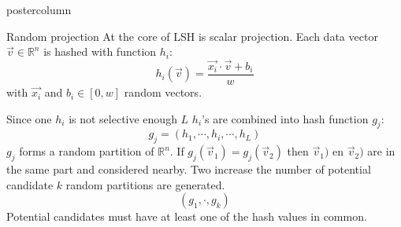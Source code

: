 \documentclass[final,hyperref={pdfpagelabels=false}]{beamer}
\begin{document}
\begin{frame}
\begin{columns}
\begin{column}{.49\textwidth}
\begin{beamercolorbox}[center,wd=\textwidth]{postercolumn}
\begin{minipage}[T]{.95\textwidth}
{            \begin{block}{Random projection}
            At the core of LSH is scalar projection.
            Each data vector $\vec{v} \in \mathbb{R}^n$ is hashed with function $h_i$:
            $$
            h_i(\vec{v})=  \frac{\vec{x_i} \cdot \vec{v} + b_i}{w}
            $$
            with $\vec{x_i}$ and $b_i \in [0,w]$ random vectors.
            
            Since one $h_i$ is not selective enough $L$ $h_i$'s are combined into 
            hash function $g_j$:
            $$
            g_j = (h_1, \cdots,h_i, \cdots, h_L)
            $$
            $g_j$ forms a random partition of $\mathbb{R}^n$. If $g_j(\vec{v}_1)= g_j(\vec{v}_2)$ then $\vec{v}_1)$ en $\vec{v}_2)$ are in the same part and considered nearby.
            Two increase the number of potential candidate $k$ random partitions are generated.
            $$
            (g_1, \cdot, g_k)
            $$
            Potential candidates must have at least one of the hash values in common.
            \end{block}
          }
        \end{minipage}
      \end{beamercolorbox}
    \end{column}


\end{columns}
\end{frame}
\end{document}
